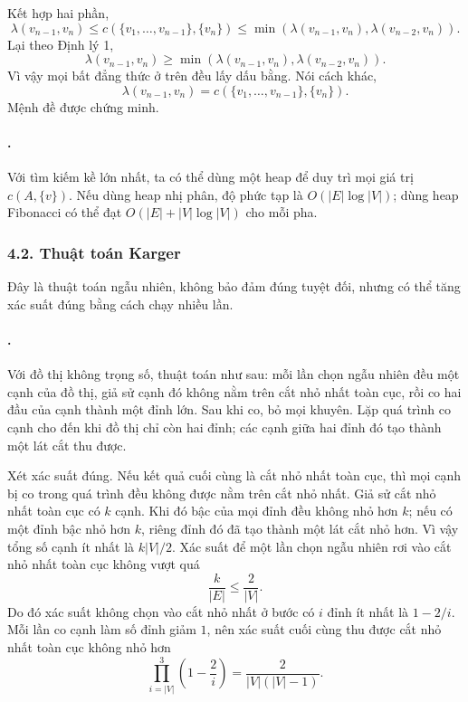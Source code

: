 \documentclass[11pt]{article}
\begin{document}
Kết hợp hai phần,
\[
  \lambda(v_{n-1},v_n)
  \le c(\{v_1,\ldots,v_{n-1}\},\{v_n\})
  \le \min(\lambda(v_{n-1},v_n),\lambda(v_{n-2},v_n)).
\]
Lại theo Định lý 1,
\[
  \lambda(v_{n-1},v_n)
  \ge \min(\lambda(v_{n-1},v_n),\lambda(v_{n-2},v_n)).
\]
Vì vậy mọi bất đẳng thức ở trên đều lấy dấu bằng. Nói cách khác,
\[
  \lambda(v_{n-1},v_n)
  = c(\{v_1,\ldots,v_{n-1}\},\{v_n\}).
\]
Mệnh đề được chứng minh.

\paragraph{.}
Với tìm kiếm kề lớn nhất, ta có thể dùng một heap để duy trì mọi giá trị
\(c(A,\{v\})\). Nếu dùng heap nhị phân, độ phức tạp là
\(O(|E|\log |V|)\); dùng heap Fibonacci có thể đạt
\(O(|E|+|V|\log |V|)\) cho mỗi pha.

\subsubsection*{4.2. Thuật toán Karger}

Đây là thuật toán ngẫu nhiên, không bảo đảm đúng tuyệt đối, nhưng có thể tăng
xác suất đúng bằng cách chạy nhiều lần.

\paragraph{.}
Với đồ thị không trọng số, thuật toán như sau: mỗi lần chọn ngẫu nhiên đều
một cạnh của đồ thị, giả sử cạnh đó không nằm trên cắt nhỏ nhất toàn cục, rồi
co hai đầu của cạnh thành một đỉnh lớn. Sau khi co, bỏ mọi khuyên. Lặp quá
trình co cạnh cho đến khi đồ thị chỉ còn hai đỉnh; các cạnh giữa hai đỉnh đó
tạo thành một lát cắt thu được.

Xét xác suất đúng. Nếu kết quả cuối cùng là cắt nhỏ nhất toàn cục, thì mọi
cạnh bị co trong quá trình đều không được nằm trên cắt nhỏ nhất. Giả sử cắt
nhỏ nhất toàn cục có \(k\) cạnh. Khi đó bậc của mọi đỉnh đều không nhỏ hơn
\(k\); nếu có một đỉnh bậc nhỏ hơn \(k\), riêng đỉnh đó đã tạo thành một lát
cắt nhỏ hơn. Vì vậy tổng số cạnh ít nhất là \(k|V|/2\). Xác suất để một lần
chọn ngẫu nhiên rơi vào cắt nhỏ nhất toàn cục không vượt quá
\[
  \frac{k}{|E|}\le \frac{2}{|V|}.
\]
Do đó xác suất không chọn vào cắt nhỏ nhất ở bước có \(i\) đỉnh ít nhất là
\(1-2/i\). Mỗi lần co cạnh làm số đỉnh giảm \(1\), nên xác suất cuối cùng thu
được cắt nhỏ nhất toàn cục không nhỏ hơn
\[
  \prod_{i=|V|}^{3}\left(1-\frac{2}{i}\right)
  = \frac{2}{|V|(|V|-1)}.
\]
\end{document}
